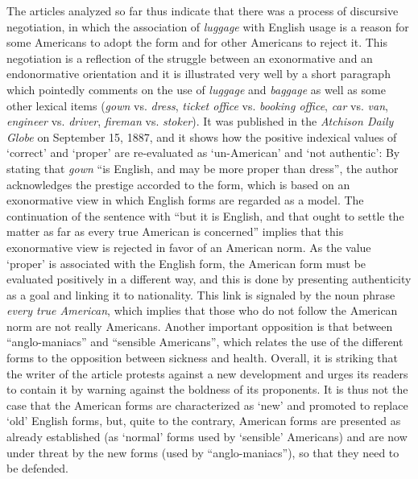 The articles analyzed so far thus indicate that there was a process of discursive negotiation, in which the association of \emph{luggage} with English usage is a reason for some Americans to adopt the form and for other Americans to reject it. This negotiation is a reflection of the struggle between an exonormative and an endonormative orientation and it is illustrated very well by a short paragraph which pointedly comments on the use of \emph{luggage} and \emph{baggage} as well as some other lexical items (\emph{gown} vs. \emph{dress}, \emph{ticket office} vs. \emph{booking office}, \emph{car} vs. \emph{van}, \emph{engineer} vs. \emph{driver}, \emph{fireman} vs. \emph{stoker}). It was published in the \emph{Atchison Daily Globe} on September 15, 1887, and it shows how the positive indexical values of ‘correct’ and ‘proper’ are re-evaluated as ‘un-American’ and ‘not authentic’: By stating that \emph{gown} “is English, and may be more proper than dress”, the author acknowledges the prestige accorded to the form, which is based on an exonormative view in which English forms are regarded as a model. The continuation of the sentence with “but it is English, and that ought to settle the matter as far as every true American is concerned” implies that this exonormative view is rejected in favor of an American norm. As the value ‘proper’ is associated with the English form, the American form must be evaluated positively in a different way, and this is done by presenting authenticity as a goal and linking it to nationality. This link is signaled by the noun phrase \emph{every true American}, which implies that those who do not follow the American norm are not really Americans. Another important opposition is that between “anglo-maniacs” and “sensible Americans”, which relates the use of the different forms to the opposition between sickness and health. Overall, it is striking that the writer of the article protests against a new development and urges its readers to contain it by warning against the boldness of its proponents. It is thus not the case that the American forms are characterized as ‘new’ and promoted to replace ‘old’ English forms, but, quite to the contrary, American forms are presented as already established (as ‘normal’ forms used by ‘sensible’ Americans) and are now under threat by the new forms (used by “anglo-maniacs”), so that they need to be defended.

